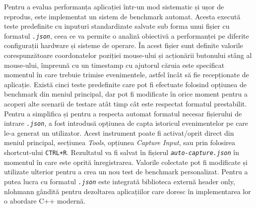 Pentru a evalua performanța aplicației într-un mod sistematic și ușor de reprodus, este implementat un sistem de benchmark automat. Acesta execută teste predefinite cu inputuri standardizate salvate sub forma unui fișier cu formatul \textit{\texttt{.json}}, ceea ce va permite o analiză obiectivă a performanței pe diferite configurații hardware și sisteme de operare. În acest fișier sunt definite valorile corespunzătoare coordonatelor poziției mouse-ului și acționării butonului stâng al mouse-ului, împreună cu un timestamp cu ajutorul căruia este specificat momentul în care trebuie trimise evenimentele, astfel încât să fie recepționate de aplicație. Există cinci teste predefinite care pot fi efectuate folosind opțiunea de benchmark din meniul principal, dar pot fi modificate în orice moment pentru a acoperi alte scenarii de testare atât timp cât este respectat formatul prestabilit. Pentru a simplifica și pentru a respecta automat formatul necesar fișierului de intrare \textit{\texttt{.json}}, a fost introdusă opțiunea de capta istoricul evenimentelor pe care le-a generat un utilizator. Acest instrument poate fi activat/oprit direct din meniul principal, secțiunea \textit{Tools}, opțiunea \textit{Capture Input}, sau prin folosirea shortcut-ului \texttt{CTRL+R}. Rezultatul va fi salvat în fișierul \textit{\texttt{auto-capture.json}} în momentul în care este oprită înregistrarea. Valorile colectate pot fi modificate și utilizate ulterior pentru a crea un nou test de benchmark personalizat. Pentru a putea lucra cu formatul \textit{\texttt{.json}} este integrată biblioteca externă header only, nlohmann \cite{nlohmann-json_citation} gândită pentru dezoltarea aplicațiilor care doresc în implementarea lor o abordare C++ modernă. 


